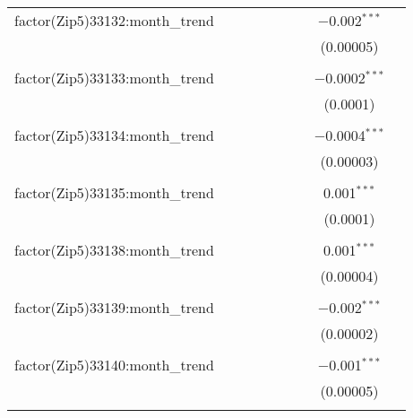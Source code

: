 \begin{table}[H]
{\begin{tabular}{@{\extracolsep{5pt}}lcccccccc}
  factor(Zip5)33132:month\_trend &  &  &  &  &  &  & $-$0.002$^{***}$ &  \\  

   &  &  &  &  &  &  & (0.00005) &  \\  

   & & & & & & & & \\  

  factor(Zip5)33133:month\_trend &  &  &  &  &  &  & $-$0.0002$^{***}$ &  \\  

   &  &  &  &  &  &  & (0.0001) &  \\  

   & & & & & & & & \\  

  factor(Zip5)33134:month\_trend &  &  &  &  &  &  & $-$0.0004$^{***}$ &  \\  

   &  &  &  &  &  &  & (0.00003) &  \\  

   & & & & & & & & \\  

  factor(Zip5)33135:month\_trend &  &  &  &  &  &  & 0.001$^{***}$ &  \\  

   &  &  &  &  &  &  & (0.0001) &  \\  

   & & & & & & & & \\  

  factor(Zip5)33138:month\_trend &  &  &  &  &  &  & 0.001$^{***}$ &  \\  

   &  &  &  &  &  &  & (0.00004) &  \\  

   & & & & & & & & \\  

  factor(Zip5)33139:month\_trend &  &  &  &  &  &  & $-$0.002$^{***}$ &  \\  

   &  &  &  &  &  &  & (0.00002) &  \\  

   & & & & & & & & \\  

  factor(Zip5)33140:month\_trend &  &  &  &  &  &  & $-$0.001$^{***}$ &  \\  

   &  &  &  &  &  &  & (0.00005) &  \\  

   & & & & & & & & \\  


\end{tabular}}
\end{table}
